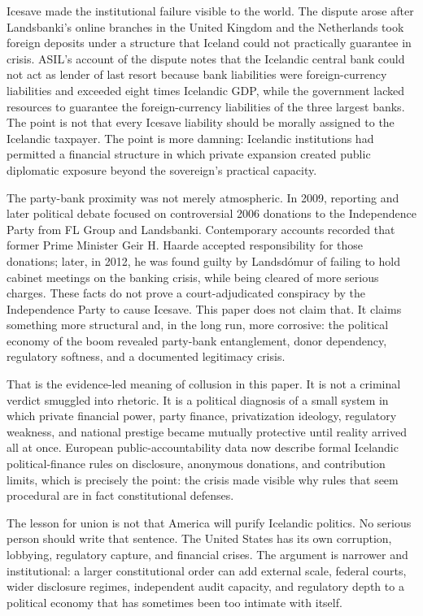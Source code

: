 \documentclass[11pt,a4paper]{article}
\begin{document}
Icesave made the institutional failure visible to the world. The dispute arose after Landsbanki's online branches in the United Kingdom and the Netherlands took foreign deposits under a structure that Iceland could not practically guarantee in crisis. ASIL's account of the dispute notes that the Icelandic central bank could not act as lender of last resort because bank liabilities were foreign-currency liabilities and exceeded eight times Icelandic GDP, while the government lacked resources to guarantee the foreign-currency liabilities of the three largest banks.\cite{asilicesave} The point is not that every Icesave liability should be morally assigned to the Icelandic taxpayer. The point is more damning: Icelandic institutions had permitted a financial structure in which private expansion created public diplomatic exposure beyond the sovereign's practical capacity.

The party-bank proximity was not merely atmospheric. In 2009, reporting and later political debate focused on controversial 2006 donations to the Independence Party from FL Group and Landsbanki. Contemporary accounts recorded that former Prime Minister Geir H. Haarde accepted responsibility for those donations; later, in 2012, he was found guilty by Landsdómur of failing to hold cabinet meetings on the banking crisis, while being cleared of more serious charges.\cite{guardianhaarde} These facts do not prove a court-adjudicated conspiracy by the Independence Party to cause Icesave. This paper does not claim that. It claims something more structural and, in the long run, more corrosive: the political economy of the boom revealed party-bank entanglement, donor dependency, regulatory softness, and a documented legitimacy crisis.

That is the evidence-led meaning of collusion in this paper. It is not a criminal verdict smuggled into rhetoric. It is a political diagnosis of a small system in which private financial power, party finance, privatization ideology, regulatory weakness, and national prestige became mutually protective until reality arrived all at once. European public-accountability data now describe formal Icelandic political-finance rules on disclosure, anonymous donations, and contribution limits, which is precisely the point: the crisis made visible why rules that seem procedural are in fact constitutional defenses.\cite{europamfinance}

The lesson for union is not that America will purify Icelandic politics. No serious person should write that sentence. The United States has its own corruption, lobbying, regulatory capture, and financial crises. The argument is narrower and institutional: a larger constitutional order can add external scale, federal courts, wider disclosure regimes, independent audit capacity, and regulatory depth to a political economy that has sometimes been too intimate with itself.
\end{document}
